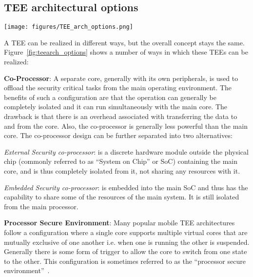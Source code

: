 \documentclass[10pt,conference,letterpaper]{IEEEtran}
\newif\ifabridged
\begin{document}
\ifabridged
\else
\subsection{TEE architectural options}
\label{subsec:arch_options}
\begin{figure*}
\texttt{[image: figures/TEE\_arch\_options.png]}
\caption{Three potential architectural options for realizing a TEE architecture (adapted from\protect~\cite{web:GP_TEE_SA})}
\label{fig:teearch_options}
\end{figure*}

A TEE can be realized in different ways, but the overall concept stays the same.
Figure~\ref{fig:teearch_options} shows a number of ways in which these TEEs can be realized:

\noindent\textbf{Co-Processor}: A separate core, generally with its own peripherals, is used to offload the security critical tasks from the main operating environment.  The benefits of such a configuration are that the operation can generally be completely isolated and it can run simultaneously with the main core.  The drawback is that there is an overhead associated with transferring the data to and from the core. Also, the co-processor is generally less powerful than the main core.  The co-processor design can be further separated into two alternatives:

\noindent\textit{External Security co-processor}: is a discrete hardware module outside the physical chip (commonly referred to as ``System on Chip'' or SoC) containing the main core, and is thus completely isolated from it, not sharing any resources with it.

\noindent\textit{Embedded Security co-processor}: is embedded into the main SoC and thus has the capability to share some of the resources of the main system. It is still isolated from the main processor.

\noindent\textbf{Processor Secure Environment}: Many popular mobile TEE architectures follow a configuration where a single core supports multiple virtual cores that are mutually exclusive of one another i.e. when one is running the other is suspended.  Generally there is some form of trigger to allow the core to switch from one state to the other. This configuration is sometimes referred to as the ``processor secure environment''~\cite{EkbergDiss}.
\end{document}
